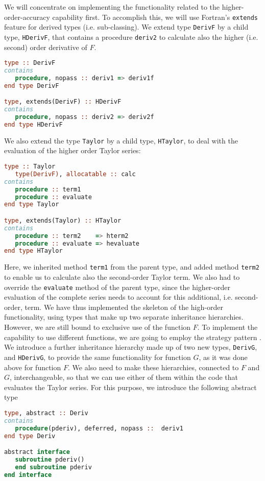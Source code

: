\documentclass[11pt,oneside]{article}
\begin{document}
We will concentrate on implementing the functionality related to the
higher-order-accuracy capability first. To accomplish this, we will
use Fortran's \texttt{extends} feature for derived types
(i.e. sub-classing). We extend type \texttt{DerivF} by a child type,
\texttt{HDerivF}, that contains a procedure \texttt{deriv2} to
calculate also the higher (i.e. second) order derivative of $F$.
\begin{lstlisting}[language=Fortran]
type :: DerivF
contains
   procedure, nopass :: deriv1 => deriv1f
end type DerivF

type, extends(DerivF) :: HDerivF
contains
   procedure, nopass :: deriv2 => deriv2f
end type HDerivF
\end{lstlisting}
We also extend the type \texttt{Taylor} by a child type,
\texttt{HTaylor}, to deal with the evaluation of the higher order
Taylor series:
\begin{lstlisting}[language=Fortran]
type :: Taylor
   type(DerivF), allocatable :: calc
contains
   procedure :: term1
   procedure :: evaluate
end type Taylor

type, extends(Taylor) :: HTaylor
contains
   procedure :: term2    => hterm2
   procedure :: evaluate => hevaluate
end type HTaylor
\end{lstlisting}
Here, we inherited method \texttt{term1} from the parent type, and
added method \texttt{term2} to enable us to calculate also the
second-order Taylor term. We also had to override the
\texttt{evaluate} method of the parent type, since the higher-order
evaluation of the complete series needs to account for this
additional, i.e. second-order, term. We have thus implemented the
skeleton of the high-order functionality, using types that make up two
separate inheritance hierarchies. However, we are still bound to
exclusive use of the function $F$. To implement the capability to use
different functions, we are going to employ the strategy pattern
\cite{Gamma_et_al_94}. We introduce a further inheritance hierarchy
made up of two new types, \texttt{DerivG}, and \texttt{HDerivG}, to
provide the same functionality for function $G$, as it was done above
for function $F$. We also need to make these hierarchies, connected to
$F$ and $G$, interchangeable, so that we can use either of them within
the code that evaluates the Taylor series. For this purpose, we
introduce the following abstract type
\begin{lstlisting}[language=Fortran]
type, abstract :: Deriv
contains
   procedure(pderiv), deferred, nopass ::  deriv1
end type Deriv

abstract interface
   subroutine pderiv()
   end subroutine pderiv      
end interface
\end{lstlisting}
\end{document}
